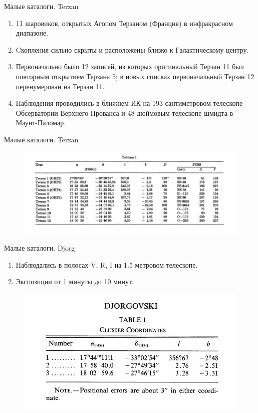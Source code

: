 \documentclass{beamer}
\begin{document}
    \begin{frame}{Малые каталоги. Terzan}
        \begin{enumerate}[]
            \item 11 шаровиков, открытых Агопом Терзаном (Франция) в инфракрасном диапазоне.
            \item Cкопления сильно скрыты и расположены близко к Галактическому центру. 
            \item Первоначально было 12 записей, из которых оригинальный Терзан 11 был повторным открытием Терзана 5; в новых списках первоначальный Терзан 12 перенумерован на Терзан 11.
            \item Наблюдения проводились в ближнем ИК на 193 сантиметровом телескопе Обсерватории Верхнего Прованса и 48 дюймовым телескопе шмидта в Маунт-Паломар. 
        \end{enumerate}
    \end{frame}
    \begin{frame}{Малые каталоги. Terzan}
        \begin{figure}[h]
            \centering
            \includegraphics[width=0.9\linewidth]{pictures/Terzan.jpg}
        \end{figure}
    \end{frame}
    \begin{frame}{Малые каталоги. Djorg}
        \begin{enumerate}[]
            \item Наблюдались в полосах V, R, I на 1.5 метровом телескопе.
            \item Экспозиции от 1 минуты до 10 минут.
        \end{enumerate}
        \begin{figure}[h]
            \centering
            \includegraphics[width=0.7\linewidth]{pictures/Djorg.jpg}
        \end{figure}
    \end{frame}
\end{document}
